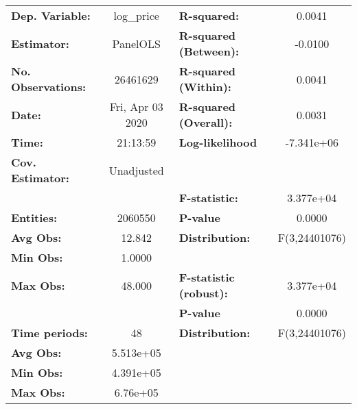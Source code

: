\documentclass{report}
\begin{document}
\begin{center}
\begin{tabular}{lclc}
\toprule
\textbf{Dep. Variable:}      &     log\_price     & \textbf{  R-squared:         }   &      0.0041      \\
\textbf{Estimator:}          &      PanelOLS      & \textbf{  R-squared (Between):}  &     -0.0100      \\
\textbf{No. Observations:}   &      26461629      & \textbf{  R-squared (Within):}   &      0.0041      \\
\textbf{Date:}               &  Fri, Apr 03 2020  & \textbf{  R-squared (Overall):}  &      0.0031      \\
\textbf{Time:}               &      21:13:59      & \textbf{  Log-likelihood     }   &    -7.341e+06    \\
\textbf{Cov. Estimator:}     &     Unadjusted     & \textbf{                     }   &                  \\
\textbf{}                    &                    & \textbf{  F-statistic:       }   &    3.377e+04     \\
\textbf{Entities:}           &      2060550       & \textbf{  P-value            }   &      0.0000      \\
\textbf{Avg Obs:}            &       12.842       & \textbf{  Distribution:      }   &  F(3,24401076)   \\
\textbf{Min Obs:}            &       1.0000       & \textbf{                     }   &                  \\
\textbf{Max Obs:}            &       48.000       & \textbf{  F-statistic (robust):} &    3.377e+04     \\
\textbf{}                    &                    & \textbf{  P-value            }   &      0.0000      \\
\textbf{Time periods:}       &         48         & \textbf{  Distribution:      }   &  F(3,24401076)   \\
\textbf{Avg Obs:}            &     5.513e+05      & \textbf{                     }   &                  \\
\textbf{Min Obs:}            &     4.391e+05      & \textbf{                     }   &                  \\
\textbf{Max Obs:}            &      6.76e+05      & \textbf{                     }   &                  \\
\bottomrule
\end{tabular}
\begin{tabular}{lcccccc}

\end{tabular}
\end{center}
\end{document}
